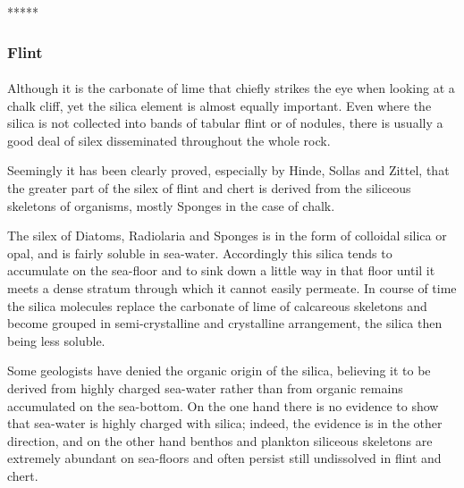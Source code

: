\documentclass[a4paper, 12pt, oneside]{article}
\begin{document}
\centerline{*\hspace{15mm}*\hspace{15mm}*\hspace{15mm}*\hspace{15mm}*}
\bigskip

\subsubsection{Flint}
\paragraph{}
Although it is the carbonate of lime that chiefly strikes the eye when looking at a chalk cliff, yet the silica element is almost equally important. Even where the silica is not collected into bands of tabular flint or of nodules, there is usually a good deal of silex disseminated throughout the whole rock.

Seemingly it has been clearly proved, especially by Hinde, Sollas and Zittel, that the greater part of the silex of flint and chert is derived from the siliceous skeletons of organisms, mostly Sponges in the case of chalk.

The silex of Diatoms, Radiolaria and Sponges is in the form of colloidal silica or opal, and is fairly soluble in sea-water. Accordingly this silica tends to accumulate on the sea-floor and to sink down a little way in that floor until it meets a dense stratum through which it cannot easily permeate. In course of time the silica molecules replace the carbonate of lime of calcareous skeletons and become grouped in semi-crystalline and crystalline arrangement, the silica then being less soluble.

Some geologists have denied the organic origin of the silica, believing it to be derived from highly charged sea-water rather than from organic remains accumulated on the sea-bottom. On the one hand there is no evidence to show that sea-water is highly charged with silica; indeed, the evidence is in the other direction, and on the other hand benthos and plankton siliceous skeletons are extremely abundant on sea-floors and often persist still undissolved in flint and chert.
\end{document}

